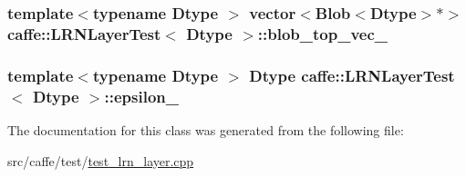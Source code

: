 \hypertarget{classcaffe_1_1_l_r_n_layer_test_aff3a0b8266c147b7922185b3153e7b68}{
\subsubsection[{blob\+\_\+top\+\_\+vec\+\_\+}]{\setlength{\rightskip}{0pt plus 5cm}template$<$typename Dtype $>$ vector$<${\bf Blob}$<$Dtype$>$$\ast$$>$ {\bf caffe\+::\+L\+R\+N\+Layer\+Test}$<$ Dtype $>$\+::blob\+\_\+top\+\_\+vec\+\_\+\hspace{0.3cm}{\ttfamily [protected]}}}\label{classcaffe_1_1_l_r_n_layer_test_aff3a0b8266c147b7922185b3153e7b68}
\hypertarget{classcaffe_1_1_l_r_n_layer_test_a9952e9353a5cb2c1155f17f315132f59}{
\subsubsection[{epsilon\+\_\+}]{\setlength{\rightskip}{0pt plus 5cm}template$<$typename Dtype $>$ Dtype {\bf caffe\+::\+L\+R\+N\+Layer\+Test}$<$ Dtype $>$\+::epsilon\+\_\+\hspace{0.3cm}{\ttfamily [protected]}}}\label{classcaffe_1_1_l_r_n_layer_test_a9952e9353a5cb2c1155f17f315132f59}


The documentation for this class was generated from the following file\+:\begin{DoxyCompactItemize}
\item 
src/caffe/test/\hyperlink{test__lrn__layer_8cpp}{test\+\_\+lrn\+\_\+layer.\+cpp}\end{DoxyCompactItemize}
